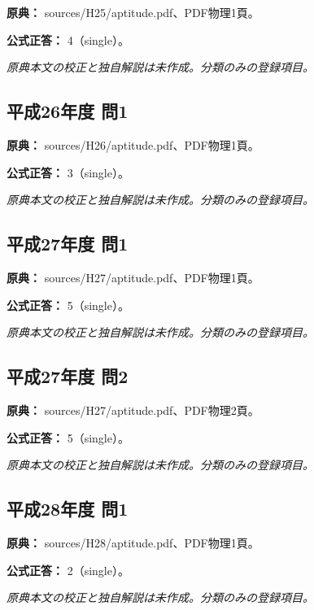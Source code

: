 \noindent\textbf{原典：} sources/H25/aptitude.pdf、PDF物理1頁。

\textbf{公式正答：} 4（single）。

\par\textit{原典本文の校正と独自解説は未作成。分類のみの登録項目。}

\subsection{平成26年度 問1}
\label{q:h26-reg-apt-01}

\noindent\textbf{原典：} sources/H26/aptitude.pdf、PDF物理1頁。

\textbf{公式正答：} 3（single）。

\par\textit{原典本文の校正と独自解説は未作成。分類のみの登録項目。}

\subsection{平成27年度 問1}
\label{q:h27-reg-apt-01}

\noindent\textbf{原典：} sources/H27/aptitude.pdf、PDF物理1頁。

\textbf{公式正答：} 5（single）。

\par\textit{原典本文の校正と独自解説は未作成。分類のみの登録項目。}

\subsection{平成27年度 問2}
\label{q:h27-reg-apt-02}

\noindent\textbf{原典：} sources/H27/aptitude.pdf、PDF物理2頁。

\textbf{公式正答：} 5（single）。

\par\textit{原典本文の校正と独自解説は未作成。分類のみの登録項目。}

\subsection{平成28年度 問1}
\label{q:h28-reg-apt-01}

\noindent\textbf{原典：} sources/H28/aptitude.pdf、PDF物理1頁。

\textbf{公式正答：} 2（single）。

\par\textit{原典本文の校正と独自解説は未作成。分類のみの登録項目。}

